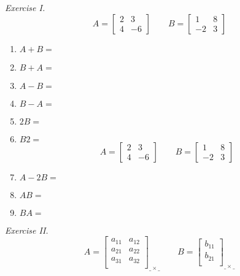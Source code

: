 \documentclass{./../../Latex/handout}
\begin{document}
\thispagestyle{plain}

\textit{Exercise I.} $$A = \begin{bmatrix}
2 & 3 \\
4 & -6 
\end{bmatrix}  \quad \quad
B = \begin{bmatrix}
1 & 8 \\
-2 & 3
\end{bmatrix}$$
\begin{enumerate}
\item $A+B = $
\vspace{5em}
\item $B+A = $
\vspace{5em}
\item $A-B = $
\vspace{5em}
\item $B-A = $
\vspace{5em}
\item $2B = $
\vspace{5em}
\item $B2 = $
\vspace{5em}
\newpage
$$A = \begin{bmatrix}
2 & 3 \\
4 & -6 
\end{bmatrix}  \quad \quad
B = \begin{bmatrix}
1 & 8 \\
-2 & 3
\end{bmatrix}$$
\item $A-2B = $
\vspace{5em}
\item $AB = $

\vspace{5em}
\item $BA =$
\vspace{8em}
\end{enumerate}

\newpage
\textit{Exercise II.} $$A = \begin{bmatrix}
a_{11} & a_{12}  \\
a_{21} & a_{22}  \\
a_{31} & a_{32}  \\
\end{bmatrix}_{\_ \times \_} \quad \quad
B = \begin{bmatrix}
b_{11}  \\
b_{21}  \\
\end{bmatrix}_{\_ \times \_} $$
\vspace{2em}
\end{document}
